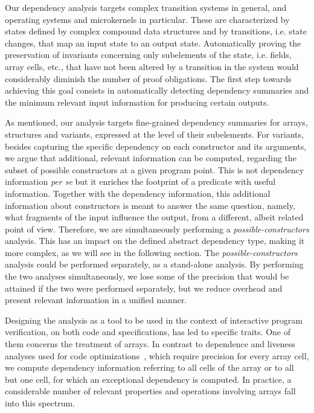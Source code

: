 \documentclass[11pt]{article}
\begin{document}
Our dependency analysis targets complex transition systems in general, and 
operating systems and microkernels in particular.
These are
characterized by states defined by complex compound data structures and by 
transitions, i.e. state changes, that map an input state to an output state. 
Automatically proving the preservation of invariants concerning only 
subelements of the state, i.e. fields, array cells, etc., that have not been 
altered by a transition in the system would considerably diminish the number of 
proof obligations. The first step towards achieving this goal consists in 
automatically detecting dependency summaries and the minimum relevant input
information for producing certain outputs.

As mentioned, our analysis targets fine-grained dependency summaries for arrays,
structures and variants, expressed at the level of their subelements. For 
variants, besides capturing the specific dependency on each constructor 
and its arguments, we argue that additional, relevant information can be 
computed, regarding the subset of possible constructors at a given program 
point. This is not dependency information \emph{per se} but it enriches the 
footprint of a predicate with useful information. Together with the dependency 
information, this additional information about constructors is meant to answer 
the same question, namely, what fragments of the input influence the output, 
from a different, albeit related point of view. Therefore, we are 
simultaneously performing a \emph{possible-constructors} analysis. This has an 
impact on the defined abstract dependency type, making it more complex, as we will see in 
the following section. The \emph{possible-constructors} analysis could be 
performed separately, as a stand-alone analysis. By performing the two analyses 
simultaneously, we lose some of the precision that would be attained if the two 
were performed separately, but we reduce overhead and present relevant 
information in a unified manner.  

Designing the analysis as a tool to be used in the context of
interactive program verification, on both code and specifications, has
led to specific traits. One of them concerns the treatment of
arrays. In contrast to dependence and liveness analyses used for code
optimizations~\cite{gross90}, which require precision for every
array cell, we compute dependency information referring to all cells
of the array or to all but one cell, for which an exceptional
dependency is computed.  In practice, a considerable number of
relevant properties and operations involving arrays fall into this
spectrum.
\end{document}
